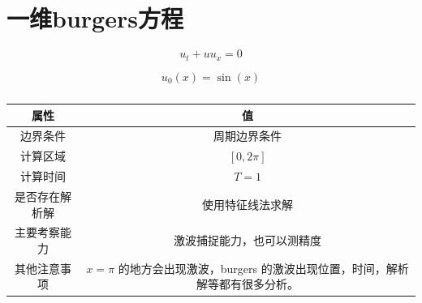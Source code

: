 \documentclass{book}
\begin{document}
\section{一维burgers方程}
\begin{equation}
    u_{t}+uu_x=0
\end{equation}
\begin{example}{}{}

    \begin{equation}
        u_0(x)=\sin(x)
    \end{equation}

    \begin{table}[htbp]
        \centering
        \label{table:}
        \caption{}
        \begin{tabular}{cc}
            \toprule
            属性           & 值                                                                             \\
            \midrule
            边界条件       & 周期边界条件                                                                   \\
            计算区域       & $[0,2\pi]$                                                                     \\
            计算时间       & $T=1$                                                                          \\
            是否存在解析解 & 使用特征线法求解                                                               \\
            主要考察能力   & 激波捕捉能力，也可以测精度                                                     \\
            其他注意事项   & $x=\pi$ 的地方会出现激波，burgers 的激波出现位置，时间，解析解等都有很多分析。 \\
            \bottomrule
        \end{tabular}
    \end{table}
\end{example}
\end{document}
